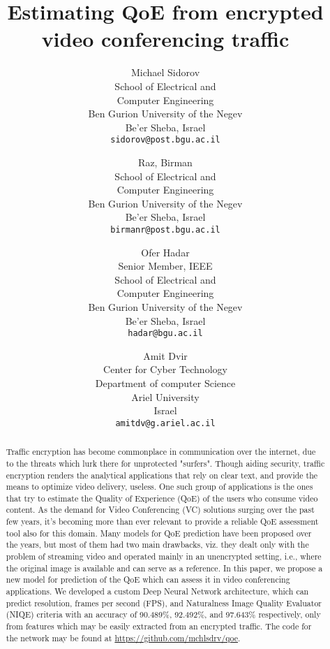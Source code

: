 \documentclass[conference]{IEEEtran}
\title{Estimating QoE from encrypted video conferencing traffic}
\author{
    Michael Sidorov\\
    School of Electrical and\\Computer Engineering\\Ben Gurion University of the Negev\\Be'er Sheba, Israel\\
    \texttt{sidorov@post.bgu.ac.il}
    \and
    Raz, Birman\\
    School of Electrical and\\Computer Engineering\\Ben Gurion University of the Negev\\Be'er Sheba, Israel\\
    \texttt{birmanr@post.bgu.ac.il}
    \and
    Ofer Hadar\\
    Senior Member, IEEE\\School of Electrical and\\Computer Engineering\\Ben Gurion University of the Negev\\Be'er Sheba, Israel\\
    \texttt{hadar@bgu.ac.il}
    \and
    Amit Dvir\\
    Center for Cyber Technology\\Department of computer Science\\Ariel University\\Israel\\
    \texttt{amitdv@g.ariel.ac.il}
}
\begin{document}
\maketitle
\begin{abstract}
Traffic encryption has become commonplace in communication over the internet, due to the threats which lurk there for unprotected "surfers". 
Though aiding security, traffic encryption renders the analytical applications that rely on clear text, and provide the means to optimize video delivery, useless. 
One such group of applications is the ones that try to estimate the Quality of Experience (QoE) of the users who consume video content. 
As the demand for Video Conferencing (VC) solutions surging over the past few years,
it's becoming more than ever relevant to provide a reliable QoE assessment tool also for this domain.
Many models for QoE prediction have been proposed over the years, but most of them had two main drawbacks, viz. they dealt only with the problem of streaming video and operated mainly in an unencrypted setting, i.e., where the original image is available and can serve as a reference.
In this paper, we propose a new model for prediction of the QoE which can assess it in video conferencing applications. We developed a custom Deep Neural Network architecture, which can predict resolution, frames per second (FPS), and Naturalness Image Quality Evaluator (NIQE) criteria with an accuracy of 90.489\%, 92.492\%, and 97.643\% respectively, only from features which may be easily extracted from an encrypted traffic. The code for the network may be found at \url{https://github.com/mchlsdrv/qoe}.



\end{abstract}
\end{document}
